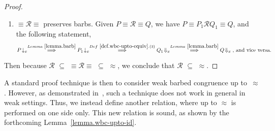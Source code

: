 \documentclass{LMCS}
\newcommand{\forget}[1]{}
\renewcommand{\_}{\mathord{\rule[-.25ex]{1ex}{.15ex}}}
\newcommand{\wbc}{\mathrel{\approx}}
\newcommand{\R}{\mathrel{\mathcal{R}}}
\newcommand{\weakbarb}[2]{#1\!\Downarrow_{#2}}
\newcommand{\barb}[2]{#1\!\downarrow_{#2}}
\begin{document}
\begin{proof}
\begin{enumerate}[(1)]
  \item $\equiv\R\equiv$ preserves barbs. Given $P\equiv\R\equiv Q$,
    we have $P\equiv P_1\R Q_1\equiv Q$, and the following statement,
    $$
    \barb{P}{x}
    \stackrel{Lemma~\ref{lemma.barb}}\Longrightarrow
    \barb{P_1}{x}
    \stackrel{Def~\ref{def.wbc-upto-equiv}.(3)}\Longrightarrow
    \weakbarb{Q_1}{x}
    \stackrel{Lemma~\ref{lemma.barb}}\Longrightarrow
    \weakbarb{Q}{x}
    \mbox{, and vice versa.}
    $$
  \end{enumerate}
  Then because $\R$ $\subseteq$ $\equiv\R\equiv$ $\subseteq$ $\wbc$,
  we conclude that $\R$ $\subseteq$ $\wbc$. \forget{\qed}
\end{proof}

A standard proof technique is then to consider weak barbed congruence up
to~$\wbc$.
However, as demonstrated in~\cite{SaMi92}, such a technique does not work
in general in weak settings.
Thus, we instead define another relation, where up to $\wbc$
is performed on one side only.
This new relation is sound, as shown by the forthcoming
Lemma~\ref{lemma.wbc-upto-id}.
\end{document}
